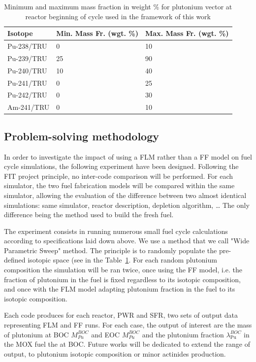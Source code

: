 \begin{table}[h]
\centering
\begin{tabular}{ |l|l|l| }
  \hline
  Isotope & Min. Mass Fr. (wgt. \%) & Max. Mass Fr. (wgt. \%) \\
  \hline
  Pu-238/TRU & 0  & 10 \\
  \hline
  Pu-239/TRU & 25 & 90 \\
  \hline
  Pu-240/TRU & 10 & 40 \\
  \hline
  Pu-241/TRU & 0  & 25 \\
  \hline
  Pu-242/TRU & 0  & 30 \\
  \hline
  Am-241/TRU & 0  & 10 \\
  \hline
\end{tabular}
\label{tab:PuVector}
\caption{Minimum and maximum mass fraction in weight \% for plutonium vector at
        reactor beginning of cycle used in the framework of this work}
\end{table}

\subsection{Problem-solving methodology}

In order to investigate the impact of using a \gls{FLM} rather than a \gls{FF} model on fuel cycle simulations, the following experiment have been designed.
Following the FIT project principle, no inter-code comparison will be performed.
For each simulator, the two fuel fabrication models will be compared within the same simulator, allowing the evaluation of the difference between two almost identical simulations: same simulator, reactor description, depletion algorithm, \ldots
The only difference being the method used to build the fresh fuel.

The experiment consists in running numerous small fuel cycle calculations according to specifications laid down above.
We use a method that we call "Wide Parametric Sweep" method. The principle is to randomly populate the pre-defined isotopic space (see in the Table~\ref{tab:PuVector}.
For each random plutonium composition the simulation will be ran twice, once using the \gls{FF} model, i.e. the fraction of plutonium in the fuel is fixed regardless to its isotopic composition, and once with the \gls{FLM} model adapting plutonium fraction in the fuel to its isotopic composition.

Each code produces for each reactor, \gls{PWR} and \gls{SFR}, two sets of output data representing \gls{FLM} and \gls{FF} runs.
For each case, the output of interest are the mass of plutonium at \gls{BOC} $M_{Pu}^{BOC}$ and \gls{EOC} $M_{Pu}^{BOC}$ and the plutonium fraction $\lambda_{\mathrm{Pu}}^{BOC}$ in the \gls{MOX} fuel the at \gls{BOC}.
Future works will be dedicated to extend the range of output, to plutonium isotopic composition or minor actinides production.

